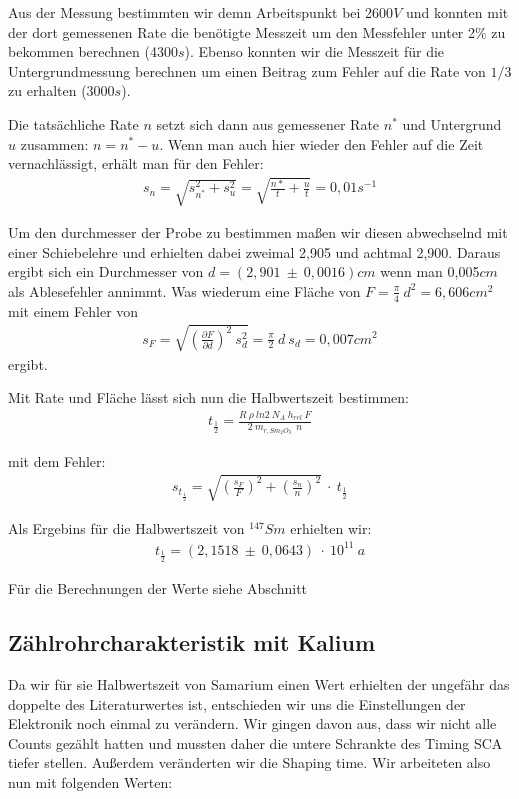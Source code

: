 \documentclass[12pt]{article}
\begin{document}
Aus der Messung bestimmten wir demn Arbeitspunkt bei 2600$V$ und konnten mit der dort gemessenen Rate die benötigte Messzeit um den Messfehler unter
2\% zu bekommen berechnen (4300$s$). Ebenso konnten wir die Messzeit für die Untergrundmessung berechnen um einen Beitrag zum Fehler auf die Rate
von $1/3$ zu erhalten (3000$s$).

Die tatsächliche Rate $n$ setzt sich dann aus gemessener Rate $n^*$ und Untergrund $u$ zusammen: $n = n^* - u$. Wenn man auch hier wieder den Fehler auf
die Zeit vernachlässigt, erhält man für den Fehler:
\begin{align}
 s_n = \sqrt{s_{n^*}^2 + s_u^2} = \sqrt{\frac{n*}{t} + \frac{u}{t}} = 0,01 s^{-1}
\end{align}

Um den durchmesser der Probe zu bestimmen maßen wir diesen abwechselnd mit einer Schiebelehre und erhielten dabei zweimal 2,905 und achtmal 2,900.
Daraus ergibt sich ein Durchmesser von $d = (2,901~ \pm~ 0,0016)cm$ wenn man 0,005$cm$ als Ablesefehler annimmt. Was wiederum eine Fläche von
$F = \frac{\pi}{4}~d^2 = 6,606 cm^2$ mit einem Fehler von
\begin{align}
 s_F = \sqrt{\left(\frac{\partial F}{\partial d}\right)^2~s_d^2} = \frac{\pi}{2}~d~s_d = 0,007 cm^2
\end{align}
ergibt.

Mit Rate und Fläche lässt sich nun die Halbwertszeit bestimmen:
\begin{align}
 t_{\frac{1}{2}} = \frac{R~\rho~ln 2 ~ N_A ~ h_{rel} ~ F}{2~m_{r,Sm_2O_3}~~n}
\end{align}

mit dem Fehler:
\begin{align}
 s_{t_{\frac{1}{2}}} = \sqrt{\left(\frac{s_F}{F}\right)^2 + \left(\frac{s_n}{n}\right)^2}~\cdot~t_{\frac{1}{2}}
\end{align}

Als Ergebins für die Halbwertszeit von $^{147}Sm$ erhielten wir:
\begin{align*}
 t_{\frac{1}{2}} = (2,1518~\pm~0,0643)~\cdot~10^11~a
\end{align*}

Für die Berechnungen der Werte siehe Abschnitt %

\subsection{Zählrohrcharakteristik mit Kalium}
Da wir für sie Halbwertszeit von Samarium einen Wert erhielten der ungefähr das doppelte des Literaturwertes ist, entschieden wir uns die Einstellungen der Elektronik noch einmal zu verändern. Wir gingen davon aus, dass wir nicht alle Counts gezählt hatten und mussten daher die untere Schrankte des Timing SCA tiefer stellen. Außerdem veränderten wir die Shaping time. Wir arbeiteten also nun mit folgenden Werten:
\end{document}
